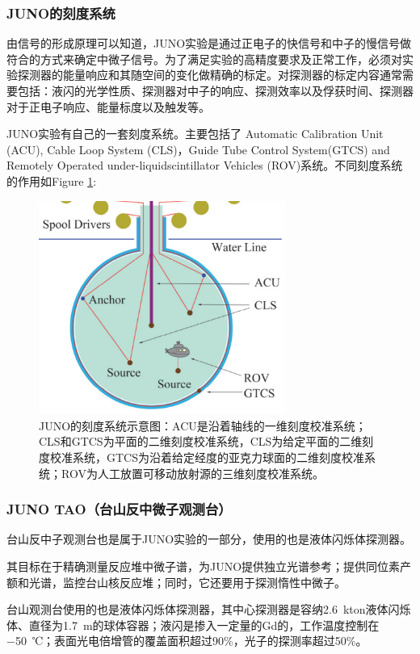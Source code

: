 \documentclass[10pt,a4paper]{article}
\begin{document}
\subsubsection{JUNO的刻度系统}\label{sub:8}
由信号的形成原理可以知道，JUNO实验是通过正电子的快信号和中子的慢信号做符合的方式来确定中微子信号。为了满足实验的高精度要求及正常工作，必须对实验探测器的能量响应和其随空间的变化做精确的标定。对探测器的标定内容通常需要包括：液闪的光学性质、探测器对中子的响应、探测效率以及俘获时间、探测器对于正电子响应、能量标度以及触发等。

JUNO实验有自己的一套刻度系统。主要包括了 Automatic Calibration Unit (ACU),
Cable Loop System (CLS)，Guide Tube Control System(GTCS) and Remotely Operated under-liquidscintillator Vehicles (ROV)系统。不同刻度系统的作用如Figure \ref{fig:41}:

\begin{figure}[H]
 \centering
 \includegraphics[height=7cm]{images/刻度系统.png}
 \caption{JUNO的刻度系统示意图：ACU是沿着轴线的一维刻度校准系统；CLS和GTCS为平面的二维刻度校准系统，CLS为给定平面的二维刻度校准系统，GTCS为沿着给定经度的亚克力球面的二维刻度校准系统；ROV为人工放置可移动放射源的三维刻度校准系统。}
 \label{fig:41}
\end{figure}

\subsubsection{JUNO TAO（台山反中微子观测台）}\label{sub:9}

台山反中子观测台也是属于JUNO实验的一部分，使用的也是液体闪烁体探测器。

其目标在于精确测量反应堆中微子谱，为JUNO提供独立光谱参考；提供同位素产额和光谱，监控台山核反应堆；同时，它还要用于探测惰性中微子。

台山观测台使用的也是液体闪烁体探测器，其中心探测器是容纳\SI{2.6}{kton}液体闪烁体、直径为\SI{1.7}{m}的球体容器；液闪是掺入一定量的Gd的，工作温度控制在\SI{-50}{℃}；表面光电倍增管的覆盖面积超过90\%，光子的探测率超过50\%。\cite{Abusleme:2020bzt}
\end{document}
